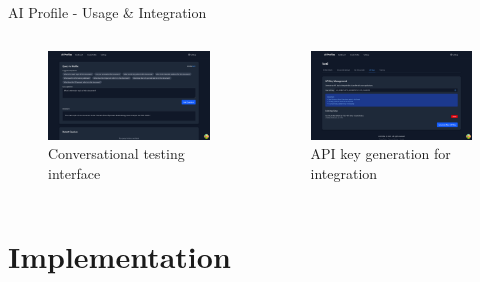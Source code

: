 \documentclass[aspectratio=169]{beamer}
\begin{document}
\begin{frame}{AI Profile - Usage \& Integration}
    \begin{columns}
        \begin{figure}
            \includegraphics[width=\textwidth,height=0.55\textheight,keepaspectratio]{../pfe-pics/ai-profile-creation/chat_interface_to_test_the_profile.png}
            \caption{Conversational testing interface}
        \end{figure}
        \begin{figure}
            \includegraphics[width=\textwidth,height=0.55\textheight,keepaspectratio]{../pfe-pics/ai-profile-creation/create_and_api_key_for_trained_profile.png}
            \caption{API key generation for integration}
        \end{figure}
    \end{columns}
\end{frame}

\section{Implementation}
\end{document}
